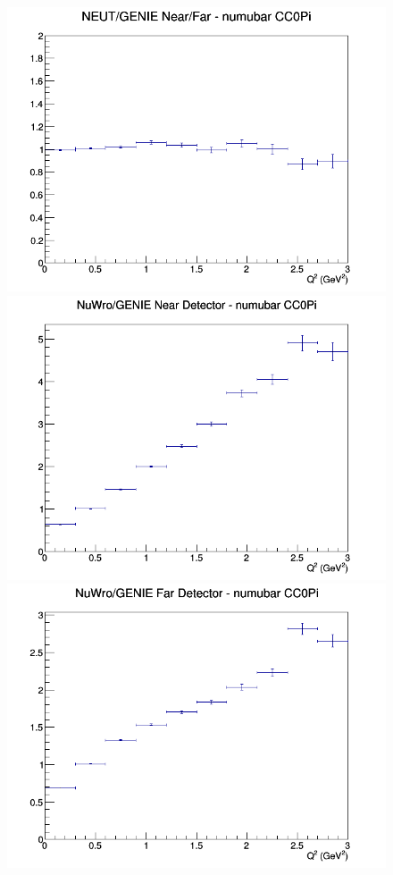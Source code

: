 \begin{figure}[h]
\endminipage
{}
\includegraphics[width=\linewidth]{Q2/nominal/ratios/CC0Pi_NEUT_GENIE_numubar_NF_Q2.png}
\endminipage
\newline
{}
\includegraphics[width=\linewidth]{Q2/nominal/ratios/CC0Pi_NuWro_GENIE_numubar_near_Q2.png}
\endminipage
{}
\includegraphics[width=\linewidth]{Q2/nominal/ratios/CC0Pi_NuWro_GENIE_numubar_far_Q2.png}

\end{figure}
